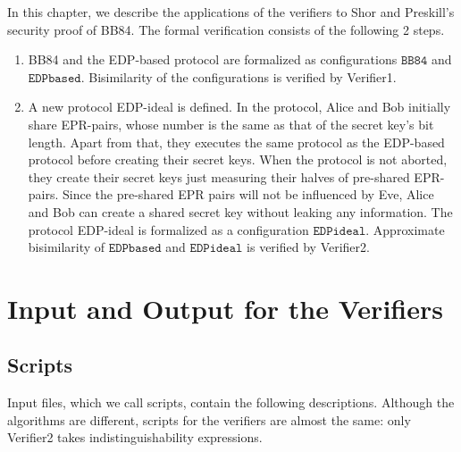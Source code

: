 In this chapter,
we describe the applications of the verifiers to
Shor and Preskill's security proof of BB84. The formal verification
consists of the following 2 steps.
\begin{enumerate}
 \item BB84 and the EDP-based protocol are formalized as configurations
       $\mathtt{BB84}$ and $\mathtt{EDPbased}$.
       Bisimilarity of the configurations is verified 
       by Verifier1.
 \item A new protocol EDP-ideal is defined.
       In the protocol, Alice and Bob 
       initially share EPR-pairs, whose
       number is the same as that of the secret key's bit length.
       Apart from that, they executes the same protocol
       as the EDP-based protocol before creating their secret keys.
       When the protocol is not aborted, they create their secret keys
       just measuring their halves of pre-shared EPR-pairs.
       Since the pre-shared EPR pairs will not be influenced
       by Eve, Alice and Bob can create a shared secret key
       without leaking any information.
       The protocol EDP-ideal is formalized as a configuration 
       $\mathtt{EDPideal}$. Approximate bisimilarity of 
       $\mathtt{EDPbased}$ and $\mathtt{EDPideal}$ is 
       verified by Verifier2.
\end{enumerate}

\section{Input and Output for the Verifiers}
\subsection{Scripts}
Input files, which we call scripts,
contain the following descriptions.
Although the algorithms are different,
scripts for the verifiers are almost the same: only Verifier2
takes indistinguishability expressions.

